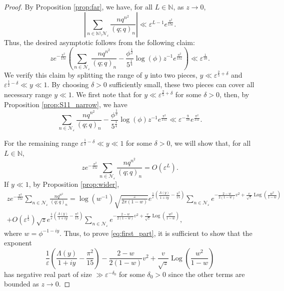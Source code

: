 \documentclass[10pt,a4paper]{amsart}
\def\Log{\operatorname{Log}}
\begin{document}
\begin{proof}
By Proposition \ref{prop:far}, we have, for all $L \in \mathbb{N}$, as $z\to 0$,
\[
	\left|\sum_{n \in \mathbb{N} \setminus \mathcal{N}_{\varepsilon}}  \frac{nq^{n^2}}{(q;q)_n} \right| \ll \varepsilon^{L-1} e^{\frac{\pi^2}{15\varepsilon}}.
\]
Thus, the desired asymptotic follows from the following claim:
\[
	z e^{-\frac{\pi^2}{15\varepsilon}} \left(\sum_{n \in \mathcal{N}_{\varepsilon}} \frac{nq^{n^2}}{(q;q)_n} - \frac{\phi^{\frac12} }{5^{\frac14}}\log(\phi)  z^{-1} e^{\frac{\pi^2}{15 z}} \right) \ll \varepsilon^{\frac{1}{10}} .
\]
We verify this claim by splitting the range of $y$ into two pieces, $y \ll \varepsilon^{\frac25+\delta}$ and  $\varepsilon^{\frac12-\delta}\ll y \ll 1$. By choosing $\delta >0$ sufficiently small, these two pieces can cover all necessary range $y \ll 1$. We first note that for $y \ll \varepsilon^{\frac25+\delta}$ for some $\delta>0$, then, by Proposition \ref{prop:S11_narrow}, we have
\[
	\sum_{n \in \mathcal{N}_{\varepsilon}} \frac{nq^{n^2}}{(q;q)_n} - \frac{\phi^{\frac12} }{5^{\frac14}}\log(\phi)  z^{-1} e^{\frac{\pi^2}{15 z}} \ll \varepsilon^{-\frac{9}{10}} e^{\frac{\pi^2}{15\varepsilon}}.
\]

For the remaining range $\varepsilon^{\frac12-\delta}\ll y \ll 1$ for some $\delta>0$, we will show that, for all $L \in \mathbb{N}$,
\begin{equation}\label{eq:first_part}
	z e^{-\frac{\pi^2}{15\varepsilon}}\sum_{n \in \mathcal{N}_{\varepsilon}} \frac{nq^{n^2}}{(q;q)_n} = O\left(\varepsilon^L\right).
\end{equation}
If $y \ll 1$, by Proposition \ref{prop:wider},
\begin{multline*}
	z e^{-\frac{\pi^2}{15\varepsilon}}\sum_{n \in \mathcal{N}_{\varepsilon}} \frac{nq^{n^2}}{(q;q)_n} = \log(w^{-1})\sqrt{\frac{z}{2\pi(1-w)}} e^{\frac{1}{\varepsilon}\left(\frac{\Lambda(y)}{1+iy}-\frac{\pi^2}{15}\right)} \sum_{n \in \mathcal{N}_{\varepsilon}} e^{-\frac{2-w}{2(1-w)}v^2 +\frac{v}{\sqrt{z}} \Log\left(\frac{w^2}{1-w}\right)}\\
	+ O\left(\varepsilon^{\frac15}\right) \sqrt{z} e^{\frac{1}{\varepsilon}\left(\frac{\Lambda(y)}{1+iy}-\frac{\pi^2}{15}\right)} \sum_{n \in \mathcal{N}_{\varepsilon}}  e^{-\frac{2-w}{2(1-w)}v^2 +\frac{v}{\sqrt{z}} \Log\left(\frac{w^2}{1-w}\right)},
\end{multline*}
where $w=\phi^{-1-iy}$. 
Thus, to prove \eqref{eq:first_part}, it is sufficient to show that the exponent
\begin{equation}\label{eq:exp}
	\frac{1}{\varepsilon}\left(\frac{\Lambda(y)}{1+iy}-\frac{\pi^2}{15}\right) -\frac{2-w}{2(1-w)}v^2 +\frac{v}{\sqrt{z}} \Log\left(\frac{w^2}{1-w}\right)
\end{equation}
has negative real part of size $\gg \varepsilon^{-\delta_0}$ for some $\delta_0>0$ since the other terms are bounded as $z\to 0$. 


\end{proof}
\end{document}

